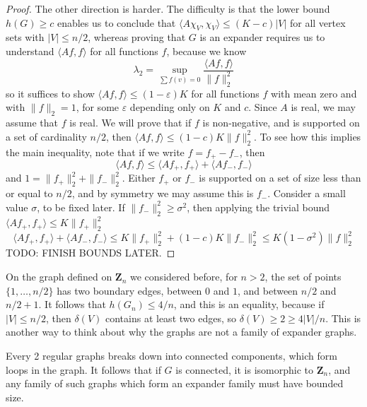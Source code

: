 \begin{proof}
    The other direction is harder. The difficulty is that the lower bound $h(G) \geq c$ enables us to conclude that $\langle A\chi_V, \chi_V \rangle \leq (K - c) |V|$ for all vertex sets with $|V| \leq n/2$, whereas proving that $G$ is an expander requires us to understand $\langle Af, f \rangle$ for all functions $f$, because we know
    \[ \lambda_2 = \sup_{\sum f(v) = 0} \frac{\langle Af, f \rangle}{\| f \|_2^2} \]
    so it suffices to show $\langle Af, f \rangle \leq (1 - \varepsilon) K$ for all functions $f$ with mean zero and with $\| f \|_2 = 1$, for some $\varepsilon$ depending only on $K$ and $c$. Since $A$ is real, we may assume that $f$ is real. We will prove that if $f$ is non-negative, and is supported on a set of cardinality $n/2$, then $\langle Af, f \rangle \leq (1 - c)K \| f \|_2^2$. To see how this implies the main inequality, note that if we write $f = f_+ - f_-$, then
    \[ \langle Af, f \rangle \leq \langle Af_+, f_+ \rangle + \langle Af_-, f_- \rangle \]
    and $1 = \| f_+ \|_2^2 + \| f_- \|_2^2$. Either $f_+$ or $f_-$ is supported on a set of size less than or equal to $n/2$, and by symmetry we may assume this is $f_-$. Consider a small value $\sigma$, to be fixed later. If $\| f_- \|_2^2 \geq \sigma^2$, then applying the trivial bound $\langle Af_+, f_+ \rangle \leq K \| f_+ \|_2^2$
    \[ \langle Af_+, f_+ \rangle + \langle Af_-, f_- \rangle \leq K \| f_+ \|_2^2 + (1-c)K \| f_- \|_2^2 \leq K(1 - \sigma^2) \| f \|_2^2 \]
    TODO: FINISH BOUNDS LATER.
\end{proof}

\begin{example}
    On the graph defined on $\mathbf{Z}_n$ we considered before, for $n > 2$, the set of points $\{ 1, \dots, n/2 \}$ has two boundary edges, between $0$ and $1$, and between $n/2$ and $n/2 + 1$. It follows that $h(G_n) \leq 4/n$, and this is an equality, because if $|V| \leq n/2$, then $\delta(V)$ contains at least two edges, so $\delta(V) \geq 2 \geq 4|V|/n$. This is another way to think about why the graphs are not a family of expander graphs.
\end{example}

\begin{example}
    Every 2 regular graphs breaks down into connected components, which form loops in the graph. It follows that if $G$ is connected, it is isomorphic to $\mathbf{Z}_n$, and any family of such graphs which form an expander family must have bounded size.
\end{example}

